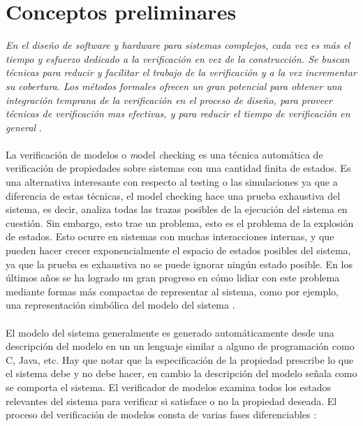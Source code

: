 \chapter{Conceptos preliminares}

\textit{En el diseño de software y hardware para sistemas complejos, cada vez es más el tiempo y esfuerzo dedicado a la verificación en vez de la construcción. Se buscan técnicas para reducir y facilitar el trabajo de la verificación y a la vez incrementar su cobertura. Los métodos formales ofrecen un gran potencial para obtener una integración temprana de la verificación en el proceso de diseño, para proveer técnicas de verificación mas efectivas, y para reducir el tiempo de verificación en general} \cite{Baier:2}.\\
\\
La verificación de modelos o \emph model \emph checking es una técnica automática de verificación de propiedades sobre sistemas con una cantidad finita de estados. Es una alternativa interesante con respecto al testing o las simulaciones ya que a diferencia de estas técnicas, el model checking hace una prueba exhaustiva del sistema, es decir, analiza todas las trazas posibles de la ejecución del sistema en cuestión. Sin embargo, esto trae un problema, esto es el problema de la explosión de estados. Esto ocurre en sistemas con muchas interacciones internas, y que pueden hacer crecer exponencialmente el espacio de estados posibles del sistema, ya que la prueba es exhaustiva no se puede ignorar ningún estado posible. En los últimos años se ha logrado un gran progreso en cómo lidiar con este problema mediante formas más compactas de representar al sistema, como por ejemplo, una representación simbólica del modelo del sistema \cite{Bryant:8} \cite{Burch:4}.\\
\\
El modelo del sistema generalmente es generado automáticamente desde una descripción del modelo en un un lenguaje similar a alguno de programación como C, Java, etc. Hay que notar que la especificación de la propiedad prescribe lo que el sistema debe y no debe hacer, en cambio la descripción del modelo señala como se comporta el sistema. El verificador de modelos examina todos los estados relevantes del sistema para verificar si satisface o no la propiedad deseada. El proceso del verificación de modelos consta de varias fases diferenciables \cite{Baier:2}:\\
